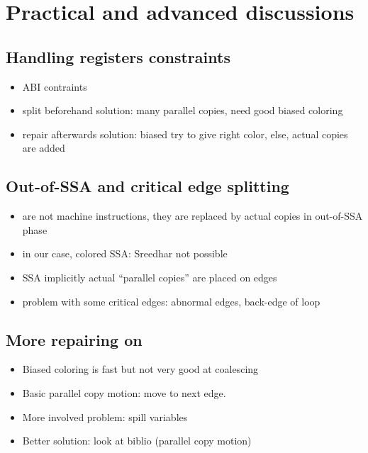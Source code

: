 \section{Practical and advanced discussions}

\subsection{Handling registers constraints}
\begin{itemize}
  \item ABI contraints
  \item split beforehand solution: many parallel copies, need good biased 
    coloring
  \item repair afterwards solution: biased try to give right color, else, 
    actual copies are added
\end{itemize}


\subsection{Out-of-SSA and critical edge splitting}
\begin{itemize}
  \item \phifuns are not machine instructions, they are replaced by actual 
    copies in out-of-SSA phase
  \item in our case, colored SSA: Sreedhar not possible
  \item SSA implicitly 
    actual ``parallel copies'' are placed on edges
  \item problem with some critical edges: abnormal edges, back-edge of loop
\end{itemize}


\subsection{More repairing on \phifuns}
\begin{itemize}
  \item Biased coloring is fast but not very good at coalescing
  \item Basic parallel copy motion: move to next edge.
  \item More involved problem: spill variables
  \item Better solution: look at biblio (parallel copy motion)
\end{itemize}


